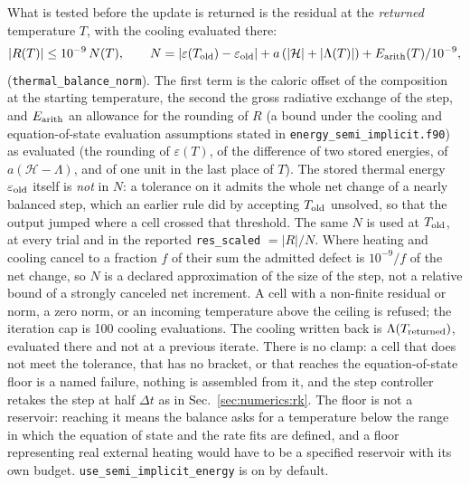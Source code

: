 What is tested before the update is returned is the residual at the
\emph{returned} temperature $T$, with the cooling evaluated there:
\begin{equation}
|R(T)| \le 10^{-9}\,N(T),\qquad
N = |\varepsilon(T_{\rm old})-\varepsilon_{\rm old}|
    + a\left(|\mathcal{H}|+|\Lambda(T)|\right) + E_{\rm arith}(T)/10^{-9},
\label{eq:th:thermalnorm}
\end{equation}
(\texttt{thermal\_balance\_norm}). The first term is the caloric offset of the
composition at the starting temperature, the second the gross radiative
exchange of the step, and $E_{\rm arith}$ an allowance for the rounding of $R$
(a bound under the cooling and equation-of-state evaluation assumptions
stated in \texttt{energy\_semi\_implicit.f90}) as
evaluated (the rounding of $\varepsilon(T)$, of the difference of two stored
energies, of $a(\mathcal{H}-\Lambda)$, and of one unit in the last place of
$T$). The stored thermal energy $\varepsilon_{\rm old}$ itself is \emph{not}
in $N$: a tolerance on it admits the whole net change of a nearly balanced
step, which an earlier rule did by accepting $T_{\rm old}$ unsolved, so that
the output jumped where a cell crossed that threshold. The same $N$ is used
at $T_{\rm old}$, at every trial and in the reported \texttt{res\_scaled}
$=|R|/N$. Where heating and cooling cancel to a fraction $f$ of their sum the
admitted defect is $10^{-9}/f$ of the net change, so $N$ is a declared
approximation of the size of the step, not a relative bound of a strongly
canceled net increment. A cell with a non-finite residual or norm, a zero
norm, or an incoming temperature above the ceiling is refused; the iteration
cap is 100 cooling evaluations. The cooling written back is
$\Lambda(T_{\rm returned})$, evaluated there and not at a previous iterate.
There is no clamp: a cell that does not meet the
tolerance, that has no bracket, or that reaches the equation-of-state floor
is a named failure, nothing is assembled from it, and the step controller
retakes the step at half $\Delta t$ as in Sec.~\ref{sec:numerics:rk}. The floor is
not a reservoir: reaching it means the balance asks for a temperature below
the range in which the equation of state and the rate fits are defined, and a
floor representing real external heating would have to be a specified
reservoir with its own budget. \texttt{use\_semi\_implicit\_energy} is on by
default.

